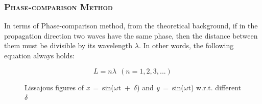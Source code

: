 \documentclass[a4paper,12pt]{article}
\begin{document}
\newpage

\subsubsection{\textsc{Phase-comparison Method}}
In terms of Phase-comparison method, from the theoretical background, if in the propagation direction two waves have the same phase, then the distance between them must be divisible by its wavelength \textit{$\lambda$}. In other words, the following equation always holds:

\begin{equation}
\textit{$L = n \lambda~~(n = 1,2,3,...)$}
\end{equation}

\begin{figure}[htbp]
\centering
{}
\quad
{}
\quad
{}
\quad
{}
\caption{Lissajous figures of \textit{x}~=~sin(\textit{$\omega$}t~+~$\delta$) and  \textit{y}~=~sin(\textit{$\omega$}t) w.r.t. different $\delta$}
\end{figure}
\end{document}

